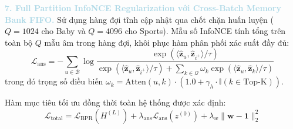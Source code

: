 \noindent\textcolor{lightblue}{\textbf{7. Full Partition InfoNCE Regularization với Cross-Batch Memory Bank FIFO.}}
Sử dụng hàng đợi tĩnh cập nhật qua chốt chặn huấn luyện ($Q=1024$ cho Baby và $Q=4096$ cho Sports). Mẫu số InfoNCE tính tổng trên toàn bộ $Q$ mẫu âm trong hàng đợi, khôi phục hàm phân phối xác suất đầy đủ:
\begin{equation}
\mathcal{L}_{\text{ans}} = -\sum_{u \in \mathcal{B}} \log \frac{\exp(\langle \hat{\mathbf{z}}_u, \hat{\mathbf{z}}_{i^+} \rangle / \tau)}{\exp(\langle \hat{\mathbf{z}}_u, \hat{\mathbf{z}}_{i^+} \rangle / \tau) + \sum_{k \in \mathcal{Q}} \omega_k \exp(\langle \hat{\mathbf{z}}_u, \hat{\mathbf{z}}_k \rangle / \tau)}
\end{equation}
trong đó trọng số điều biến $\omega_k = \text{Atten}(u, k) \cdot (1.0 + \gamma_h \cdot \mathbb{I}(k \in \text{Top-K}))$.

Hàm mục tiêu tối ưu đồng thời toàn hệ thống được xác định:
\begin{equation}
\mathcal{L}_{\text{total}} = \mathcal{L}_{\text{BPR}}(H^{(L)}) + \lambda_{\text{ans}} \mathcal{L}_{\text{ans}}(z^{(0)}) + \lambda_w \|\mathbf{w} - \mathbf{1}\|_2^2
\end{equation}

